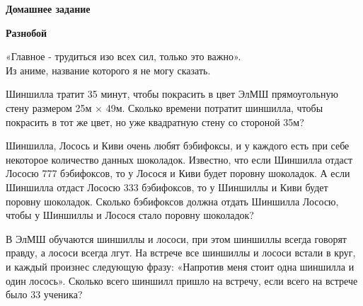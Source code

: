 \centerline{\bf \Huge Домашнее задание}
\centerline{\bf \Huge Разнобой}

\begin{flushright}
        \scriptsize{«Главное - трудиться изо всех сил, только это важно».\\Из аниме, название которого я не могу сказать.}
\end{flushright}


 Шиншилла тратит 35 минут, чтобы покрасить в цвет ЭлМШ прямоугольную стену размером 25м × 49м. Сколько времени потратит шиншилла, чтобы покрасить в тот же цвет, но уже квадратную стену со стороной 35м?

 Шиншилла, Лосось и Киви очень любят бэбифоксы, и у каждого есть при себе некоторое количество данных шоколадок. Известно, что если Шиншилла отдаст Лососю 777 бэбифоксов, то у Лосося и Киви будет поровну шоколадок. А если Шиншилла отдаст Лососю 333 бэбифоксов, то у Шиншиллы и Киви будет поровну шоколадок. Сколько бэбифоксов должна отдать Шиншилла Лососю, чтобы у Шиншиллы и Лосося стало поровну шоколадок?
  
 В ЭлМШ обучаются шиншиллы и лососи, при этом шиншиллы всегда говорят правду, а лососи всегда лгут. На встрече все шиншиллы и лососи встали в круг, и каждый произнес следующую фразу: «Напротив меня стоит одна шиншилла и один лосось». Сколько всего шиншилл пришло на встречу, если всего на встрече было 33 ученика?
